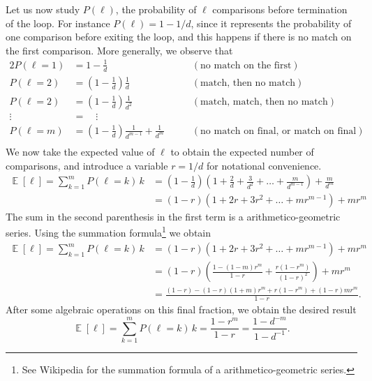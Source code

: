 \documentclass[12pt, a4paper]{article}
\DeclareMathOperator{\E}{\mathbb{E}}
\begin{document}
{Let us now study $P(\ell)$, the probability of $\ell$ comparisons before termination of the loop. 
For instance $P(\ell) = 1 - 1/d$, since it represents the probability of one comparison before exiting the loop, and this happens if there is no match on the first comparison.
More generally, we observe that
\begin{alignat*}{2}
	P(\ell = 1) &= 1 - \frac{1}{d} &\qquad (\text{no match on the first}) \\
	P(\ell = 2) &= \left(1 - \frac{1}{d}\right) \frac{1}{d} &\qquad (\text{match, then no match}) \\
	P(\ell = 2) &= \left(1 - \frac{1}{d}\right) \frac{1}{d^2} &\qquad (\text{match, match, then no match}) \\
	\vdots \quad &= \quad \vdots &  \\
	P(\ell = m) &= \left(1 - \frac{1}{d}\right) \frac{1}{d^{m-1}} + \frac{1}{d^m} &\qquad (\text{no match on final, or match on final}) \\
\end{alignat*}
We now take the expected value of $\ell$ to obtain the expected number of comparisons, and introduce a variable $r = 1/d$ for notational convenience.
\begin{align*}
	\E \left[ \ell \right] = \sum_{k=1}^{m} P(\ell = k) \, k
	& = \left(1 - \frac{1}{d}\right) \left( 1 + \frac{2}{d} + \frac{3}{d^2} + \dots + \frac{m}{d^{m-1}} \right) + \frac{m}{d^m} \\
	& = \left(1 - r\right) \left( 1 + 2r + 3r^2 + \dots + m r^{m-1} \right) + m r^m 
\end{align*}
The sum in the second parenthesis in the first term is a arithmetico-geometric series.
Using the summation formula\footnote{See Wikipedia for the summation formula of a arithmetico-geometric series.} we obtain
\begin{align*}
\E \left[ \ell \right] = \sum_{k=1}^{m} P(\ell = k) \, k
& =\left(1 - r\right) \left( 1 + 2r + 3r^2 + \dots + m r^{m-1} \right) + m r^m \\
&=\left(1 - r\right) \left( 
\frac{1 - (1-m) r^m}{1 - r}
+ 
\frac{r(1 - r^m)}{(1 - r)^2}
 \right) + m r^m \\
 &=
 \frac{(1-r) - (1-r)(1+m)r^m + r(1-r^m) + (1-r)mr^m}{1-r}.
\end{align*}
After some algebraic operations on this final fraction, we obtain the desired result 
\begin{equation*}
	\E \left[ \ell \right] = \sum_{k=1}^{m} P(\ell = k) \, k = \frac{1 - r^m}{1 - r} = \frac{1 - d^{-m}}{1 - d^{-1}}.

\end{equation*}}
\end{document}
